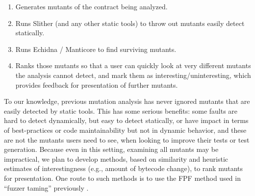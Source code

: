 \documentclass{article}
\begin{document}
\begin{enumerate}
\item Generates mutants of the contract being analyzed.
\item Runs Slither (and any other static tools) to throw out mutants easily detect statically.
\item Runs Echidna / Manticore to find surviving mutants.
\item Ranks those mutants so that a user can quickly look at very different mutants the analysis cannot detect, and mark them as interesting/uninteresting, which provides feedback for presentation of further mutants.
\end{enumerate}

To our knowledge, previous mutation analysis has never ignored mutants that are easily detected by static tools.  This has some serious benefits:  some faults are hard to detect dynamically, but easy to detect statically, or have impact in terms of best-practices or code maintainability but not in dynamic behavior, and these are not the mutants users need to see, when looking to improve their tests or test generation.  Because even in this setting, examining all mutants may be impractical, we plan to develop methods, based on similarity and heuristic estimates of interestingness (e.g., amount of bytecode change), to rank mutants for presentation.  One route to such methods is to use the FPF \cite{Gonzalez85} method used in ``fuzzer taming'' previously \cite{PLDI13,distMut}.



\end{document}
